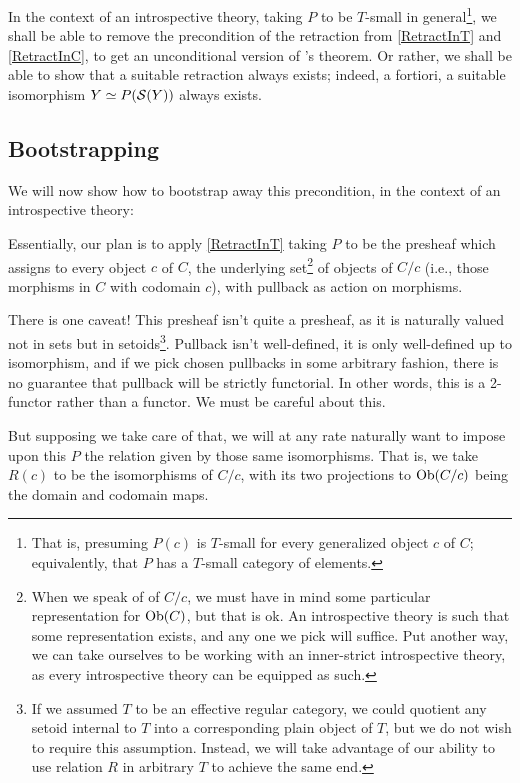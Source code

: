 In the context of an introspective theory, taking $P$ to be $T$-small in general\footnote{That is, presuming $P(c)$ is $T$-small for every generalized object $c$ of $C$; equivalently, that $P$ has a $T$-small category of elements.}, we shall be able to remove the precondition of the retraction from \cref{RetractInT} and \cref{RetractInC}, to get an unconditional version of \Loeb's theorem. Or rather, we shall be able to show that a suitable retraction always exists; indeed, a fortiori, a suitable isomorphism $Y \simeq P(\mathcal{S}(Y))$ always exists.

\subsection{Bootstrapping}
We will now show how to bootstrap away this precondition, in the context of an introspective theory:

Essentially, our plan is to apply \cref{RetractInT} taking $P$ to be the presheaf which assigns to every object $c$ of $C$, the underlying set\footnote{When we speak of  of $C/c$, we must have in mind some particular representation for $\operatorname{Ob}(C)$, but that is ok. An introspective theory is such that some representation exists, and any one we pick will suffice. Put another way, we can take ourselves to be working with an inner-strict introspective theory, as every introspective theory can be equipped as such.} of objects of $C/c$ (i.e., those morphisms in $C$ with codomain $c$), with pullback as action on morphisms.

There is one caveat! This presheaf isn't quite a presheaf, as it is naturally valued not in sets but in setoids\footnote{If we assumed $T$ to be an effective regular category, we could quotient any setoid internal to $T$ into a corresponding plain object of $T$, but we do not wish to require this assumption. Instead, we will take advantage of our ability to use relation $R$ in arbitrary $T$ to achieve the same end.}. Pullback isn't well-defined, it is only well-defined up to isomorphism, and if we pick chosen pullbacks in some arbitrary fashion, there is no guarantee that pullback will be strictly functorial. In other words, this is a 2-functor rather than a functor. We must be careful about this.

But supposing we take care of that, we will at any rate naturally want to impose upon this $P$ the relation given by those same isomorphisms. That is, we take $R(c)$ to be the isomorphisms of $C/c$, with its two projections to $\operatorname{Ob}(C/c)$ being the domain and codomain maps.

